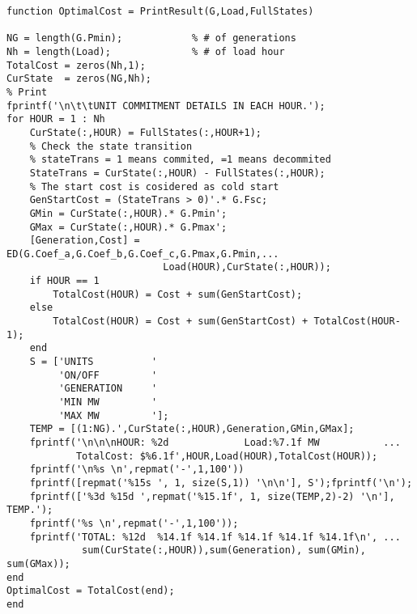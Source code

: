 \begin{verbatim}
function OptimalCost = PrintResult(G,Load,FullStates)

NG = length(G.Pmin);            % # of generations
Nh = length(Load);              % # of load hour
TotalCost = zeros(Nh,1);
CurState  = zeros(NG,Nh);
% Print
fprintf('\n\t\tUNIT COMMITMENT DETAILS IN EACH HOUR.');
for HOUR = 1 : Nh
    CurState(:,HOUR) = FullStates(:,HOUR+1);
    % Check the state transition
    % stateTrans = 1 means commited, =1 means decommited
    StateTrans = CurState(:,HOUR) - FullStates(:,HOUR);
    % The start cost is cosidered as cold start
    GenStartCost = (StateTrans > 0)'.* G.Fsc;
    GMin = CurState(:,HOUR).* G.Pmin';
    GMax = CurState(:,HOUR).* G.Pmax';
    [Generation,Cost] = ED(G.Coef_a,G.Coef_b,G.Coef_c,G.Pmax,G.Pmin,...
                           Load(HOUR),CurState(:,HOUR));
    if HOUR == 1
        TotalCost(HOUR) = Cost + sum(GenStartCost);
    else
        TotalCost(HOUR) = Cost + sum(GenStartCost) + TotalCost(HOUR-1);
    end
    S = ['UNITS          '
         'ON/OFF         '
         'GENERATION     '
         'MIN MW         '
         'MAX MW         '];
    TEMP = [(1:NG).',CurState(:,HOUR),Generation,GMin,GMax];
    fprintf('\n\n\nHOUR: %2d             Load:%7.1f MW           ...
            TotalCost: $%6.1f',HOUR,Load(HOUR),TotalCost(HOUR));
    fprintf('\n%s \n',repmat('-',1,100'))
    fprintf([repmat('%15s ', 1, size(S,1)) '\n\n'], S');fprintf('\n');
    fprintf(['%3d %15d ',repmat('%15.1f', 1, size(TEMP,2)-2) '\n'], TEMP.');
    fprintf('%s \n',repmat('-',1,100'));
    fprintf('TOTAL: %12d  %14.1f %14.1f %14.1f %14.1f %14.1f\n', ...
             sum(CurState(:,HOUR)),sum(Generation), sum(GMin), sum(GMax));
end
OptimalCost = TotalCost(end);
end
\end{verbatim}

